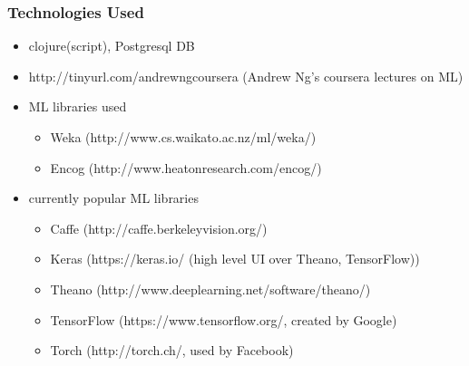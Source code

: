 \documentclass{beamer}
\begin{document}
\begin{frame}
  \frametitle{Technologies Used}
    \begin{itemize}
    \item clojure(script), Postgresql DB
    \item http://tinyurl.com/andrewngcoursera (Andrew Ng's coursera lectures on ML)
    \item ML libraries used
      \begin{itemize}
      \item Weka (http://www.cs.waikato.ac.nz/ml/weka/)
      \item Encog (http://www.heatonresearch.com/encog/)
      \end{itemize}
    \item currently popular ML libraries
      \begin{itemize}
      \item Caffe (http://caffe.berkeleyvision.org/)
      \item Keras (https://keras.io/ (high level UI over Theano, TensorFlow))
      \item Theano (http://www.deeplearning.net/software/theano/)
      \item TensorFlow (https://www.tensorflow.org/, created by Google)
      \item Torch (http://torch.ch/, used by Facebook)
      \end{itemize}
    \end{itemize}
\end{frame}
\end{document}
